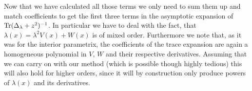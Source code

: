 Now that we have calculated all those terms we only need to sum them up and
match coefficients to get the first three terms in the asymptotic expansion of
$\operatorname{Tr}(\Delta_\lambda + z^2)^{-1}$. In particular we have to deal with the fact,
that $\lambda(x) = \lambda^2 V(x) + W(x)$ is of mixed order. Furthermore we note
that, as it was for the interior parametrix, the coefficients of the trace
expansion are again a homogeneous polynomial in $V$, $W$ and their respective
derivatives. Assuming that we can carry on with our method (which is possible
though highly tedious) this will also hold for higher orders, since it will by
construction only produce powers of $\lambda(x)$ and its derivatives.

